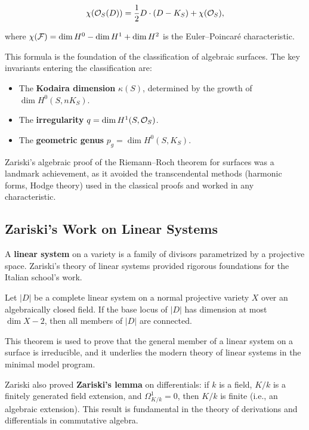 \[
\chi(\mathcal{O}_S(D)) = \frac{1}{2} D \cdot (D - K_S) + \chi(\mathcal{O}_S),
\]

where $\chi(\mathcal{F}) = \dim H^0 - \dim H^1 + \dim H^2$ is the Euler--Poincar{\'e} characteristic.

This formula is the foundation of the classification of algebraic surfaces. The key invariants entering the classification are:
\begin{itemize}
    \item The \textbf{Kodaira dimension} $\kappa(S)$, determined by the growth of $\dim H^0(S, nK_S)$.
    \item The \textbf{irregularity} $q = \dim H^1(S, \mathcal{O}_S)$.
    \item The \textbf{geometric genus} $p_g = \dim H^0(S, K_S)$.
\end{itemize}

Zariski's algebraic proof of the Riemann--Roch theorem for surfaces was a landmark achievement, as it avoided the transcendental methods (harmonic forms, Hodge theory) used in the classical proofs and worked in any characteristic.

\subsection{Zariski's Work on Linear Systems}

A \textbf{linear system} on a variety is a family of divisors parametrized by a projective space. Zariski's theory of linear systems provided rigorous foundations for the Italian school's work.

\begin{theorem}
Let $|D|$ be a complete linear system on a normal projective variety $X$ over an algebraically closed field. If the base locus of $|D|$ has dimension at most $\dim X - 2$, then all members of $|D|$ are connected.
\end{theorem}

This theorem is used to prove that the general member of a linear system on a surface is irreducible, and it underlies the modern theory of linear systems in the minimal model program.

Zariski also proved \textbf{Zariski's lemma} on differentials: if $k$ is a field, $K/k$ is a finitely generated field extension, and $\Omega_{K/k}^1 = 0$, then $K/k$ is finite (i.e., an algebraic extension). This result is fundamental in the theory of derivations and differentials in commutative algebra.


